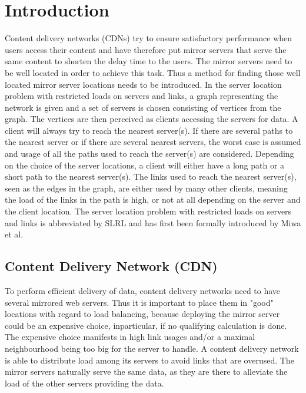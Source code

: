 \documentclass [12pt]{article}
\begin{document}
\thispagestyle{empty}

\newpage
\tableofcontents
\newpage


\section{Introduction}
Content delivery networks (CDNs) try to ensure satisfactory performance when users access their content 
and have therefore put mirror servers that serve the same content to shorten the delay time to the users.
The mirror servers need to be well located in order to achieve this task. Thus a method for finding those well located mirror server locations needs to be introduced.
In the server location problem with restricted loads on servers and links, a graph representing the network is given and a set of servers is chosen consisting of vertices from the graph. The vertices are then perceived as clients
accessing the servers for data. A client will always try to reach the nearest server(s). If there are several paths to the nearest server or if there are several nearest servers, the worst case is assumed
and usage of all the paths used to reach the server(s) are considered.
Depending on the choice of the server locations, a client will either have a long path or a short path to the nearest server(s). The links used to reach the nearest server(s), seen as the edges in the graph,
are either used by many other clients, meaning the load of the links in the path is high, or not at all depending on the server and the client location. The server location problem with restricted loads
on servers and links is abbreviated by SLRL and has first been formally introduced by Miwa et al. ~\cite{mirrorserver}

\subsection {Content Delivery Network (CDN)}
To perform efficient delivery of data, content delivery networks need to have several mirrored web servers.
Thus it is important to place them in "good" locations with regard to load balancing, because deploying the mirror server 
could be an expensive choice, inparticular, if no qualifying calculation is done. %
The expensive choice manifests in high link usages and/or a maximal neighbourhood being
too big for the server to handle. A content delivery network is able to distribute load among its servers to avoid
links that are overused.
The mirror servers naturally serve the same data, as they are there to alleviate the 
load of the other servers providing the data.
\end{document}
